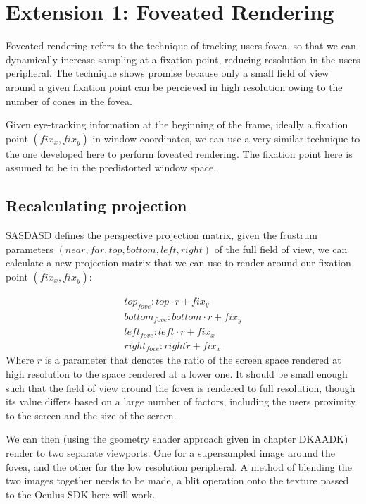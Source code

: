 \documentclass[12pt,a4paper,twoside,openright]{report}
\begin{document}
\section{Extension 1: Foveated Rendering}

Foveated rendering refers to the technique of tracking users fovea, so that we can dynamically increase sampling at a fixation point, reducing resolution in the users peripheral. The technique shows promise because only a small field of view around a given fixation point can be percieved in high resolution owing to the number of cones in the fovea.

Given eye-tracking information at the beginning of the frame, ideally a fixation point $(fix_x,fix_y)$ in window coordinates, we can use a very similar technique to the one developed here to perform foveated rendering. The fixation point here is assumed to be in the predistorted window space. 

\subsection{Recalculating projection}

SASDASD defines the perspective projection matrix, given the frustrum parameters $(near, far, top, bottom, left, right)$ of the full field of view, we can calculate a new projection matrix that we can use to render around our fixation point $(fix_x, fix_y)$:

\[
\begin{matrix}
top_{fove}: top \cdot r + fix_y \\
bottom_{fove}: bottom \cdot r + fix_y \\
left_{fove}: left \cdot r + fix_x \\
right_{fove}: right \dot r + fix_x 
\end{matrix}
\]
Where $r$ is a parameter that denotes the ratio of the screen space rendered at high resolution to the space rendered at a lower one. It should be small enough such that the field of view around the fovea is rendered to full resolution, though its value differs based on a large number of factors, including the users proximity to the screen and the size of the screen.

We can then (using the geometry shader approach given in chapter DKAADK) render to two separate viewports. One for a supersampled image around the fovea, and the other for the low resolution peripheral. A method of blending the two images together needs to be made, a blit operation onto the texture passed to the Oculus SDK here will work. 
\end{document}
